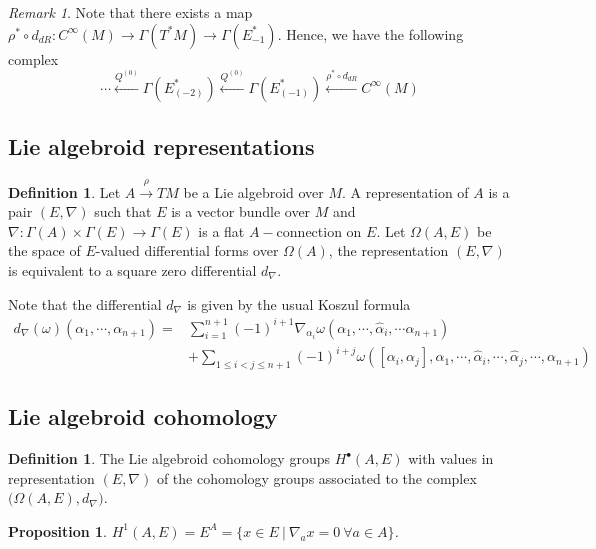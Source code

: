 \documentclass[12pt]{amsart}
\newtheorem{prop}[thm]{Proposition}
\theoremstyle{definition}
\newtheorem{defn}[thm]{Definition}
\theoremstyle{remark}
\newtheorem{rem}[thm]{Remark}
\numberwithin{equation}{section}
\newcommand{\1}{{\mathbb{1}}}
\begin{document}
\begin{rem}
	Note that there exists a map $\rho^*\circ d_{dR}: C^{\infty} (M) \to \Gamma(T^*M)\to \Gamma (E^*_{-1})$. Hence, we have the following complex
	\begin{equation*}
	\cdots \stackrel{Q^{(0)}}{\longleftarrow} \Gamma(E^*_{(-2)})\stackrel{Q^{(0)}}{\longleftarrow}\Gamma(E^*_{(-1)})\stackrel{\rho^*\circ d_{dR}}{\longleftarrow}C^{\infty} (M)
	\end{equation*} 
\end{rem}





\subsection{Lie algebroid representations}
\begin{defn}
	Let $A\stackrel{\rho}{\to} TM$ be a Lie algebroid over $M$. A representation of $A$ is a pair $(E,\nabla)$ such that $E$ is a vector bundle over $M$ and $\nabla:\Gamma(A)\times \Gamma(E)\to \Gamma(E)$ is a flat $A-$connection on $E$.
	Let $\Omega(A,E)$ be the space of $E$-valued differential forms over $\Omega(A)$, the representation $(E,\nabla)$ is equivalent to a square zero differential $d_{\nabla}$.  
\end{defn}

Note that the differential $d_{\nabla}$ is given by the usual Koszul formula
\begin{align*}
d_{\nabla}(\omega)(\alpha_1,\cdots,\alpha_{n+1})=&\sum_{i=1}^{n+1} (-1)^{i+1} \nabla_{\alpha_i}\omega (\alpha_1,\cdots,\hat{\alpha}_i, \cdots\alpha_{n+1})\\
&+\sum_{1\le i<j\le  n+1} (-1)^{i+j} \omega ([\alpha_i, \alpha_j], \alpha_1, \cdots, \hat{\alpha}_i, \cdots, \hat{\alpha}_j, \cdots, \alpha_{n+1}  )
\end{align*}
\subsection{Lie algebroid cohomology}
\begin{defn}
	The Lie algebroid cohomology groups $H^{\bullet}(A,E)$ with values in representation $(E,\nabla)$ of the cohomology groups associated to the complex $\big(\Omega(A,E), d_{\nabla}\big)$.
\end{defn}


\begin{prop}
$H^1(A,E)=E^A=\{x\in E\ |\  \nabla_{a}x=0\  \forall a\in A \} $.
\end{prop}
\end{document}
